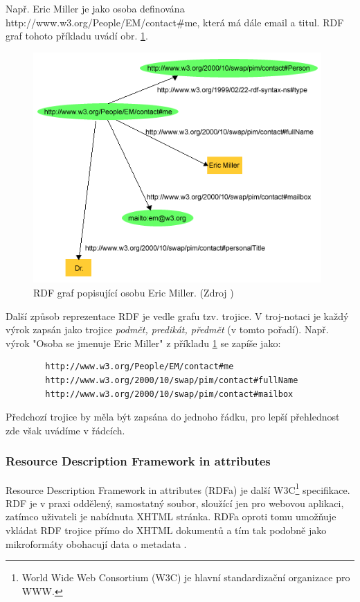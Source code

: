         Např. Eric Miller je jako osoba definována http://www.w3.org/People/EM/contact\#me, která má dále email a titul. RDF graf tohoto příkladu uvádí obr. \ref{img:miller}.
        
        \begin{figure}[h]
        \begin{center}
        \includegraphics[width=11cm]{figures/rdf}
        \caption{RDF graf popisující osobu Eric Miller. (Zdroj \cite{RDFprimer})}
        \label{img:miller}
        \end{center}
        \end{figure}

        Další způsob reprezentace RDF je vedle grafu tzv. trojice. V troj-notaci je každý výrok zapsán jako trojice \textit{podmět, predikát, předmět} (v tomto pořadí). 
        Např. výrok "Osoba se jmenuje Eric Miller" z příkladu \ref{img:miller} se zapíše jako:
        
        \begin{verbatim}
        http://www.w3.org/People/EM/contact#me 
        http://www.w3.org/2000/10/swap/pim/contact#fullName 
        http://www.w3.org/2000/10/swap/pim/contact#mailbox
        \end{verbatim}
        Předchozí trojice by měla být zapsána do jednoho řádku, pro lepší přehlednost zde však uvádíme v řádcích.
        
        \subsubsection{Resource Description Framework in attributes} 
        
        Resource Description Framework in attributes (RDFa) je další W3C\footnote{World Wide Web Consortium (W3C) je hlavní standardizační organizace pro WWW.} specifikace.
        RDF je v praxi oddělený, samostatný soubor, sloužící jen pro webovou aplikaci, zatímco uživateli je nabídnuta XHTML stránka. 
        RDFa oproti tomu umožňuje vkládat RDF trojice přímo do XHTML dokumentů a tím tak podobně jako mikroformáty obohacují data o metadata \cite{RDFa}.
        
